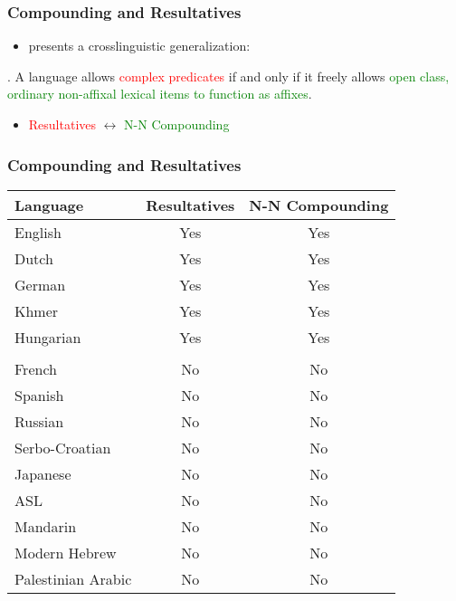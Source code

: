 \documentclass[Proposal]{subfiles}
\begin{document}
\begin{frame}
  \frametitle{Compounding and Resultatives}
  \begin{itemize}
    \item \textcite{snyder1995language} presents a crosslinguistic generalization:
  \end{itemize}
  \ex. A language allows \textcolor<2|handout:0>{red}{complex predicates} if and only if it freely allows \textcolor<2|handout:0>{green}{open class, ordinary non-affixal lexical items to function as affixes}. \parencite[35]{snyder1995language}

  \begin{itemize}
    \item<2> \textcolor<2|handout:0>{red}{Resultatives} $\leftrightarrow$ \textcolor<2|handout:0>{green}{N-N Compounding}
  \end{itemize}
\end{frame}
\begin{frame}
  \frametitle{Compounding and Resultatives}
  \begin{center}
  {\small
  \begin{tabular}[t]{lcc}
    \textbf{Language} & \textbf{Resultatives} & \textbf{N-N Compounding}\\
    \hline
    English & Yes & Yes\\
    Dutch & Yes & Yes\\
    German & Yes & Yes\\
    Khmer & Yes & Yes\\
    Hungarian & Yes & Yes\\
    & & \\
    French & No & No\\
    Spanish & No & No\\
    Russian & No & No\\
    Serbo-Croatian & No & No\\
    Japanese & No & No\\
    ASL & No & No\\
    Mandarin & No & No\\
    Modern Hebrew & No & No\\
    Palestinian Arabic & No & No\\
  \end{tabular}}
\end{center}
\end{frame}
\end{document}
